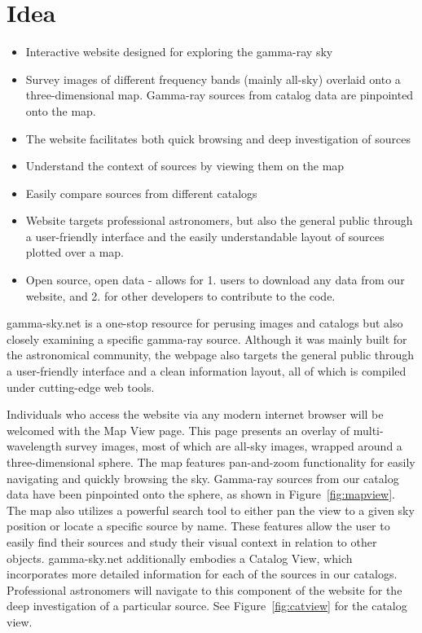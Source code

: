 \section{Idea}

\begin{itemize}

\item Interactive website designed for exploring the gamma-ray sky

\item Survey images of different frequency bands (mainly all-sky) overlaid onto a three-dimensional map. Gamma-ray sources from catalog data are pinpointed onto the map.

\item The website facilitates both quick browsing and deep investigation of sources

\item Understand the context of sources by viewing them on the map

\item Easily compare sources from different catalogs

\item Website targets professional astronomers, but also the general public through
a user-friendly interface and the easily understandable layout of sources plotted over a map.

\item Open source, open data - allows for 1. users to download any data from our website, and 2. for other developers to contribute to the code.

\end{itemize}


    gamma-sky.net is a one-stop resource for perusing images and catalogs but also closely examining a specific gamma-ray source.
    Although it was mainly built for the astronomical community, the webpage also targets the general public through a
    user-friendly interface and a clean information layout, all of which is compiled under cutting-edge web tools.

    Individuals who access the website via any modern internet browser will be welcomed with the Map View page.
    This page presents an overlay of multi-wavelength survey images, most of which are all-sky images, wrapped around a three-dimensional sphere.
    The map features pan-and-zoom functionality for easily navigating and quickly browsing the sky. Gamma-ray sources from
    our catalog data have been pinpointed onto the sphere, as shown in Figure~\ref{fig:mapview}. The map also utilizes a powerful search tool to either pan the view to a given sky position or locate a specific source by name. These features allow the user to easily find their sources and study their visual context in relation to other objects.
    gamma-sky.net additionally embodies a Catalog View, which incorporates more detailed information for each of the sources in our catalogs.
    Professional astronomers will navigate to this component of the website for the deep investigation of a particular source.
    See Figure~\ref{fig:catview} for the catalog view.

